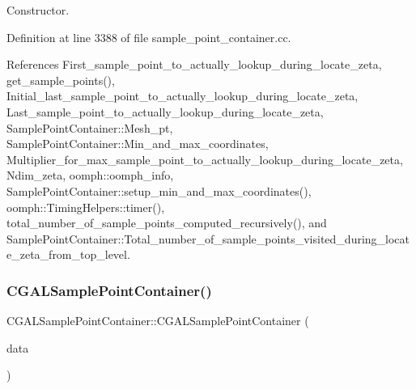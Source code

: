 Constructor. 



Definition at line 3388 of file sample\+\_\+point\+\_\+container.\+cc.



References First\+\_\+sample\+\_\+point\+\_\+to\+\_\+actually\+\_\+lookup\+\_\+during\+\_\+locate\+\_\+zeta, get\+\_\+sample\+\_\+points(), Initial\+\_\+last\+\_\+sample\+\_\+point\+\_\+to\+\_\+actually\+\_\+lookup\+\_\+during\+\_\+locate\+\_\+zeta, Last\+\_\+sample\+\_\+point\+\_\+to\+\_\+actually\+\_\+lookup\+\_\+during\+\_\+locate\+\_\+zeta, Sample\+Point\+Container\+::\+Mesh\+\_\+pt, Sample\+Point\+Container\+::\+Min\+\_\+and\+\_\+max\+\_\+coordinates, Multiplier\+\_\+for\+\_\+max\+\_\+sample\+\_\+point\+\_\+to\+\_\+actually\+\_\+lookup\+\_\+during\+\_\+locate\+\_\+zeta, Ndim\+\_\+zeta, oomph\+::oomph\+\_\+info, Sample\+Point\+Container\+::setup\+\_\+min\+\_\+and\+\_\+max\+\_\+coordinates(), oomph\+::\+Timing\+Helpers\+::timer(), total\+\_\+number\+\_\+of\+\_\+sample\+\_\+points\+\_\+computed\+\_\+recursively(), and Sample\+Point\+Container\+::\+Total\+\_\+number\+\_\+of\+\_\+sample\+\_\+points\+\_\+visited\+\_\+during\+\_\+locate\+\_\+zeta\+\_\+from\+\_\+top\+\_\+level.

\mbox{\label{classCGALSamplePointContainer_aacc2148f5ee065a747dce7f79281f7c8}} 
\subsubsection{\texorpdfstring{C\+G\+A\+L\+Sample\+Point\+Container()}{CGALSamplePointContainer()}\hspace{0.1cm}{\footnotesize\ttfamily [2/2]}}
{\footnotesize\ttfamily C\+G\+A\+L\+Sample\+Point\+Container\+::\+C\+G\+A\+L\+Sample\+Point\+Container (\begin{DoxyParamCaption}\item[{const \hyperlink{classCGALSamplePointContainer}{C\+G\+A\+L\+Sample\+Point\+Container} \&}]{data }\end{DoxyParamCaption})\hspace{0.3cm}{\ttfamily [inline]}}



